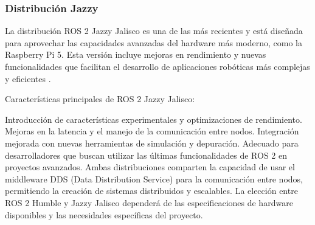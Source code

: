     \subsubsection{Distribución Jazzy}

    La distribución ROS 2 Jazzy Jalisco es una de las más recientes y está diseñada para aprovechar las capacidades avanzadas del hardware más moderno, como la Raspberry Pi 5. Esta versión incluye mejoras en rendimiento y nuevas funcionalidades que facilitan el desarrollo de aplicaciones robóticas más complejas y eficientes \cite{jazzy_documentation}.

    Características principales de ROS 2 Jazzy Jalisco:

    Introducción de características experimentales y optimizaciones de rendimiento.
    Mejoras en la latencia y el manejo de la comunicación entre nodos.
    Integración mejorada con nuevas herramientas de simulación y depuración.
    Adecuado para desarrolladores que buscan utilizar las últimas funcionalidades de ROS 2 en proyectos avanzados.
    Ambas distribuciones comparten la capacidad de usar el middleware DDS (Data Distribution Service) para la comunicación entre nodos, permitiendo la creación de sistemas distribuidos y escalables. La elección entre ROS 2 Humble y Jazzy Jalisco dependerá de las especificaciones de hardware disponibles y las necesidades específicas del proyecto.


